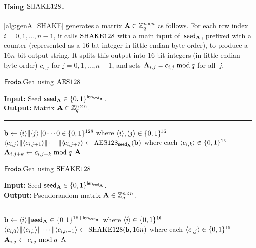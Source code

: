 \paragraph{Using $\textrm{\upshape\mdseries SHAKE}128$.}

\autoref{alg:genA_SHAKE} generates a matrix
$\mathbf{A} \in \mathbb{Z}_{q}^{n \times n}$ as follows. For each row index
$i=0,1,\ldots,n-1$, it calls $\textrm{\upshape\mdseries SHAKE}128$ with a main input
of~${\mathsf{seed}_{\mathbf{A}}}$, prefixed with a counter (represented as a 16-bit integer in little-endian byte order), to produce a
$16n$-bit output string. It splits this output into 16-bit integers (in little-endian byte order)
$c_{i,j}$ for $j=0,1,\ldots, n-1$, and sets
$\mathbf{A}_{i,j} = c_{i,j} \bmod q$ for all~$j$.

\begin{algorithm}[]
\caption{\label{alg:genA_AES} $\textsf{\upshape\mdseries Frodo}.\textrm{\upshape\mdseries Gen}$ using $\textrm{\upshape\mdseries AES128}$}
{\bf Input:} Seed ${\mathsf{seed}_{\mathbf{A}}} \in \{0,1\}^{\mathsf{len}_{{\mathsf{seed}_{\mathbf{A}}}}}$.\\
{\bf Output:} Matrix $\mathbf{A} \in \mathbb{Z}_q^{n\times n}$.\\[-1.5ex]
\rule{\linewidth}{.5pt}
\vspace{-0.5cm}
\begin{algorithmic}[1]
    \STATE $\mathbf{b} \gets \langle i\rangle \| \langle j\rangle \|0 \cdots 0 \in
    \{0,1\}^{128}$ where $\langle i\rangle, \langle j\rangle \in \{0,1\}^{16}$
    \STATE $\langle c_{i,j}\rangle \| \langle c_{i,j+1}\rangle \| \cdots \| \langle c_{i,j+7}\rangle \gets
    \textrm{\upshape\mdseries AES128}_{{\mathsf{seed}_{\mathbf{A}}}}(\mathbf{b})$ where each $\langle c_{i,k}\rangle \in \{0,1\}^{16}$
    \STATE $\mathbf{A}_{i,j+k} \gets c_{i,j+k} \bmod q$
    \ENDFOR
    \ENDFOR
    \ENDFOR
    \RETURN $\mathbf{A}$
\end{algorithmic}
\end{algorithm}

\begin{algorithm}[]
\caption{\label{alg:genA_SHAKE} $\textsf{\upshape\mdseries Frodo}.\textrm{\upshape\mdseries Gen}$ using $\textrm{\upshape\mdseries SHAKE}128$}
{\bf Input:} Seed ${\mathsf{seed}_{\mathbf{A}}} \in \{0,1\}^{\mathsf{len}_{{\mathsf{seed}_{\mathbf{A}}}}}$.\\
{\bf Output:} Pseudorandom matrix $\mathbf{A} \in \mathbb{Z}_q^{n\times n}$.\\[-1.5ex]
\rule{\linewidth}{.5pt}
\vspace{-0.5cm}
\begin{algorithmic}[1]
    \STATE $\mathbf{b} \gets \langle i\rangle \| {\mathsf{seed}_{\mathbf{A}}} \in
    \{0,1\}^{16+{\mathsf{len}_{{\mathsf{seed}_{\mathbf{A}}}}}}$ where $\langle i\rangle \in \{0,1\}^{16}$
    \STATE $\langle c_{i,0}\rangle \| \langle c_{i,1}\rangle \| \cdots \|
    \langle c_{i,n-1}\rangle \gets \textrm{\upshape\mdseries SHAKE}128(\mathbf{b}, 16n)$
    where each $\langle c_{i,j}\rangle \in \{0,1\}^{16}$
    \STATE $\mathbf{A}_{i,j} \gets c_{i,j} \bmod q$
    \ENDFOR
    \ENDFOR
    \RETURN$\mathbf{A}$
\end{algorithmic}
\end{algorithm}


